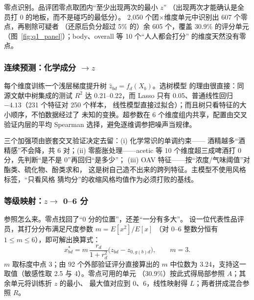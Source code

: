 \documentclass[12pt,a4paper]{article}
\begin{document}
零点识别。品评团零点取团内``至少出现两次的最小 $z$''
（出现两次才能确认是全员打 0 的地板，而不是碰巧的最低分）。
2{,}050 个团$\times$维度单元中识别出 607 个零点，再剔除可疑者
（还原后负分超过 5\% 的）余 605 个，覆盖 30.9\% 的评分单元
（图~\ref{fig:q1_panel}）；body、overall 等 10 个``人人都会打分''
的维度天然没有零点。


\subsubsection{连续预测：化学成分 $\to z$}

每个维度训练一个浅层梯度提升树 $\hat z_{bd}=f_d(X_b)$。选树模型
的理由很直接：同源文献中树集成的测试 $R^2$ 达 0.21--0.22，而
Lasso 只有 0.05、普通线性回归 $-4.13$（231 个特征对 250 个样本，
线性模型直接过拟合）；而且树只看特征的大小顺序，不怕数据经过了
未知的变换。超参数在 6 个维度组内共享，配置由交叉验证内层的平均
Spearman 选择，避免逐维调参把噪声当规律。

三个加强项由嵌套交叉验证决定去留：(i) 化学常识的单调约束——
酒精越多``酒精感''不会降，共 6 对；(ii) 零膨胀处理——acetic 等
10 个维度超三成啤酒打 0 分，先判断``是不是 0''再回归``是多少''；
(iii) OAV 特征——按``浓度/气味阈值''对酯类、硫化物、酚类求和，
这是树自己造不出来的跨列特征。主模型不使用风格标签，``只看风格
猜均分''的收缩风格均值作为必须打败的基线。

\subsubsection{等级映射：$z\to$ 0--6 分}

参照怎么来。零点找回了``0 分的位置''，还差``一分有多大''。
设一位代表性品评员，其打分分布满足尺度参数 $m=E[x^2]/E[x]$
（对 0--6 整数分恒有 $1\le m\le6$），即可解出换算式：
\begin{equation}
  x^*_{bd}=m\,\frac{r_d}{1+r_d^2}\bigl(z_{bd}-z_{0,g(b)d}\bigr),
  \qquad m=3 .
\end{equation}
$m$ 取标度中点 3；由 92 个外部验证评分直接算出的 $m$ 中位数为
3.24，支持这一取值（敏感性取 2.5 与 4）。零点可用的单元
（30.9\%）按此式得局部参照 $A$；其余单元将训练折 $z$ 的最小、
最大值对应到 0、6，线性映射得 $L$；两者拼成混合参照 $R$。
\end{document}
